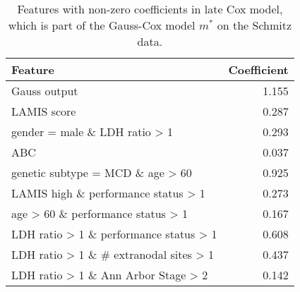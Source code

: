 \begin{table}[ht]
    \centering
    \small
    \begin{tabular}{lr}
        \hline
        \textbf{Feature} & \textbf{Coefficient} \\
        \hline
        Gauss output & 1.155 \\
        LAMIS score & 0.287 \\
        gender = male \& LDH ratio > 1 & 0.293 \\
        ABC & 0.037 \\
        genetic subtype = MCD \& age > 60 & 0.925 \\
        LAMIS high \& performance status > 1 & 0.273 \\
        age > 60 \& performance status > 1 & 0.167 \\
        LDH ratio > 1 \& performance status > 1 & 0.608 \\
        LDH ratio > 1 \& \# extranodal sites > 1 & 0.437 \\
        LDH ratio > 1 \& Ann Arbor Stage > 2 & 0.142 \\
        \hline
        \end{tabular}
        \caption{Features with non-zero coefficients in late Cox model, which is part of the 
            Gauss-Cox model $m^*$ on the Schmitz data.}
    \label{tab:coefficients}
\end{table}